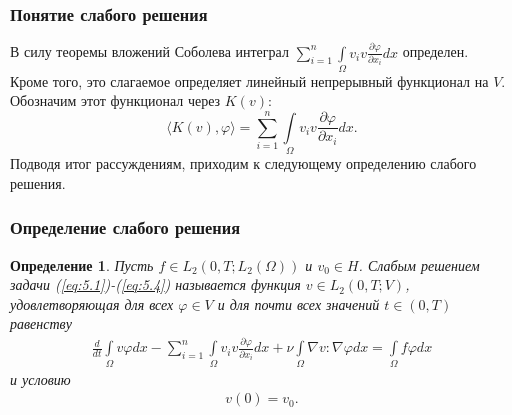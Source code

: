 \documentclass[10pt, pdf, hyperref={unicode}]{beamer}
\newtheorem{ru_def}{Определение}
\renewenvironment{definition}{\begin{ru_def}}{\end{ru_def}}
\begin{document}
  \begin{frame}
    \frametitle{Понятие слабого решения}
    \begin{center}
      \begin{minipage}[h]{0.97\linewidth}
      В силу теоремы вложений Соболева интеграл $\sum\limits_{i=1}^{n}\int\limits_\Omega v_iv \frac{\partial\varphi}{\partial x_i}dx$ определен.\\
      Кроме того, это слагаемое определяет линейный непрерывный функционал на $V$. Обозначим этот функционал через $K(v)$:
      $$\langle K(v),\varphi \rangle = \sum_{i=1}^{n}\int\limits_\Omega v_i v \frac{\partial \varphi}{\partial x_i}dx.$$
      Подводя итог рассуждениям, приходим к следующему определению слабого решения.
      \end{minipage}
    \end{center}
  \end{frame}

  \begin{frame}
    \frametitle{Определение слабого решения}
    \begin{center}
      \begin{minipage}[h]{0.97\linewidth}
\begin{definition}
    Пусть $f\in L_2(0,T;L_2(\Omega))$ и $v_0\in H$. Слабым решением задачи (\ref{eq:5.1})-(\ref{eq:5.4}) называется функция $v\in L_2(0, T;V)$,
    удовлетворяющая для всех $\varphi \in V$ и для почти всех значений $t \in (0, T)$ равенству
    \begin{equation}\label{eq:5.6}
        \begin{gathered}
            \frac{d}{dt}\int\limits_\Omega v \varphi dx-\sum_{i=1}^{n}\int\limits_\Omega v_i v
            \frac{\partial \varphi }{\partial x_i}dx + \nu\int\limits_\Omega \nabla v :\nabla\varphi dx=
            \int\limits_\Omega f \varphi dx
        \end{gathered}
    \end{equation}
    и условию
    \begin{equation}\label{eq:5.7}
        \begin{gathered}
            v(0) = v_0.
        \end{gathered}
    \end{equation}
\end{definition}
      \end{minipage}
    \end{center}
  \end{frame}
  
\end{document}
